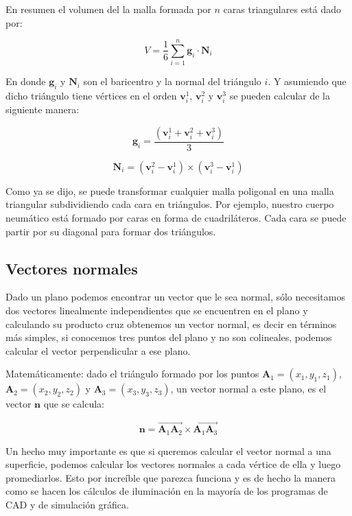 En resumen el volumen del la malla formada por $n$ caras triangulares está dado por:

\begin{equation}
V = \frac{1}{6} \sum_{i=1}^{n} \textbf{g}_i \cdot \textbf{N}_i
\label{eq:volumen}
\end{equation}

En donde $\textbf{g}_i$ y $\textbf{N}_i$ son el baricentro y la normal del triángulo $i$. Y asumiendo que dicho triángulo tiene vértices en el orden $\textbf{v}_{i}^{1}$, $\textbf{v}_{i}^{2}$ y $\textbf{v}_{i}^{3}$ se pueden calcular de la siguiente manera:

\begin{equation}
\textbf{g}_{i} = \frac{(\textbf{v}_{i}^{1} + \textbf{v}_{i}^{2} + \textbf{v}_{i}^{3})}{3}
\label{eq:baricentro}
\end{equation}

\begin{equation}
\textbf{N}_i = (\textbf{v}_{i}^{2} - \textbf{v}_{i}^{1}) \times (\textbf{v}_{i}^{3} - \textbf{v}_{i}^{1})
\label{eq:normTriag}
\end{equation}

Como ya se dijo, se puede transformar cualquier malla poligonal en una malla triangular subdividiendo cada cara en triángulos.
Por ejemplo, nuestro cuerpo neumático está formado por caras en forma de cuadriláteros.
Cada cara se puede partir por su diagonal para formar dos triángulos.

\subsection{Vectores normales}
Dado un plano podemos encontrar un vector que le sea normal, sólo necesitamos dos vectores linealmente independientes que se encuentren en el plano y calculando su producto cruz obtenemos un vector normal, es decir en términos más simples, si conocemos tres puntos del plano y no son colineales, podemos calcular el vector perpendicular a ese plano.

Matemáticamente: dado el triángulo formado por los puntos $\textbf{A}_1 = (x_1, y_1, z_1)$, $\textbf{A}_2 = (x_2, y_2, z_2)$ y $\textbf{A}_3 = (x_3, y_3, z_3)$, un vector normal a este plano, es el vector $\textbf{n}$ que se calcula:

$$ \textbf{n} = \overrightarrow{\textbf{A}_1 \textbf{A}_2} \times \overrightarrow{\textbf{A}_1 \textbf{A}_3}$$

Un hecho muy importante es que si queremos calcular el vector normal a una superficie, podemos calcular los vectores normales a cada vértice de ella y luego promediarlos.
Esto por increíble que parezca funciona y es de hecho la manera como se hacen los cálculos de iluminación en la mayoría de los programas de CAD y de simulación gráfica.

